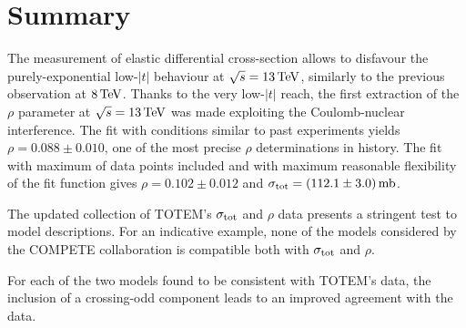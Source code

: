 \section{Summary}
\label{sec:summary}

The measurement of elastic differential cross-section allows to disfavour the purely-exponential low-$|t|$ behaviour at $\sqrt s = 13\,{\rm TeV}$, similarly to the previous observation at $8\,{\rm TeV}$. Thanks to the very low-$|t|$ reach, the first extraction of the $\rho$ parameter at $\sqrt s = 13\,{\rm TeV}$ was made exploiting the Coulomb-nuclear interference. The fit with conditions similar to past experiments yields $\rho = 0.088 \pm 0.010$, one of the most precise $\rho$ determinations in history. The fit with maximum of data points included and with maximum reasonable flexibility of the fit function gives $\rho = 0.102 \pm 0.012$ and $\sigma_{\rm tot} = (112.1 \pm 3.0)\,{\rm mb}$.

The updated collection of TOTEM's $\sigma_{\rm tot}$ and $\rho$ data presents a stringent test to model descriptions. For an indicative example, none of the models considered by the COMPETE collaboration is compatible both with $\sigma_{\rm tot}$ and $\rho$.

For each of the two models found to be consistent with TOTEM's data, the inclusion of a crossing-odd component leads to an improved agreement with the data.
